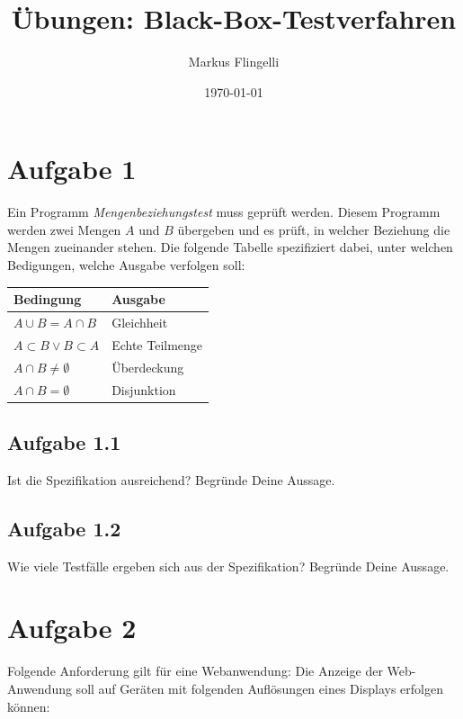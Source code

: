 

\title{Übungen: Black-Box-Testverfahren}
\author{Markus Flingelli}
\date{\today}


\maketitle

\section*{Aufgabe 1}
Ein Programm \emph{Mengenbeziehungstest} muss geprüft werden. Diesem Programm werden zwei Mengen $A$ und $B$ übergeben und es prüft, in welcher Beziehung die Mengen zueinander stehen. Die folgende Tabelle spezifiziert dabei, unter welchen Bedigungen, welche Ausgabe verfolgen soll:

\vspace{.3cm}

\begin{center}
\begin{tabular}{|l|l|}
\hline
\textbf{Bedingung} & \textbf{Ausgabe}\\ \hline
$A \cup B = A \cap B$ & Gleichheit\\ \hline
$A \subset B \lor B \subset A$ & Echte Teilmenge\\ \hline
$A \cap B \neq \emptyset$ & Überdeckung\\ \hline
$A \cap B = \emptyset$ & Disjunktion\\ \hline
\end{tabular}
\end{center}

\subsection*{Aufgabe 1.1}
Ist die Spezifikation ausreichend? Begründe Deine Aussage.

\subsection*{Aufgabe 1.2}
Wie viele Testfälle ergeben sich aus der Spezifikation? Begründe Deine Aussage.

\newpage
\section*{Aufgabe 2}

Folgende Anforderung gilt für eine Webanwendung: Die Anzeige der Web-Anwendung soll auf Geräten mit folgenden Auflösungen eines Displays erfolgen können:

